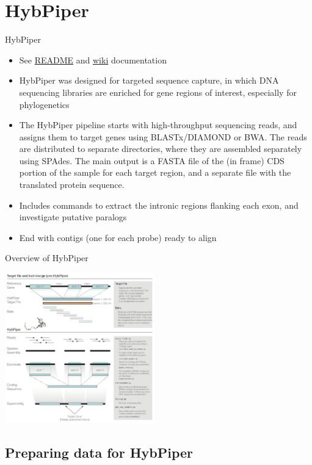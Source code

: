 \documentclass[compress,  xelatex, 11pt, xcolor=x11names, aspectratio=169,
	hyperref={
		bookmarks=true,
		unicode=true,
		colorlinks=true,
		pdftitle={HybSeq course},
		plainpages=false,
		pdfauthor={Vojtech Zeisek},
		pdfsubject={Practical processing of HybSeq target enrichment sequencing data on computing grids like MetaCentrum},
		pdfcreator={XeLaTeX},
		pdfkeywords={BASH, command line, GNU, HybSeq, Linux, MetaCentrum, sequencing shell, target enrichment},
		linkcolor=Turquoise4, %
		anchorcolor=DodgerBlue4, %
		citecolor=DodgerBlue4, %
		filecolor=DodgerBlue4, %
		menucolor=Tan4, %
		urlcolor=DarkOliveGreen4 %
		},
	url={hyphens, lowtilde} %
	]{beamer}
\begin{document}
\section{HybPiper}

\begin{frame}{HybPiper}
	\begin{itemize}
		\item See \href{https://github.com/mossmatters/HybPiper\#readme}{README} and \href{https://github.com/mossmatters/HybPiper/wiki}{wiki} documentation
		\item HybPiper was designed for targeted sequence capture, in which DNA sequencing libraries are enriched for gene regions of interest, especially for phylogenetics
		\item The HybPiper pipeline starts with high-throughput sequencing reads, and assigns them to target genes using BLASTx/DIAMOND or BWA. The reads are distributed to separate directories, where they are assembled separately using SPAdes. The main output is a FASTA file of the (in frame) CDS portion of the sample for each target region, and a separate file with the translated protein sequence.
		\item Includes commands to extract the intronic regions flanking each exon, and investigate putative paralogs
		\item End with contigs (one for each probe) ready to align
	\end{itemize}
\end{frame}

\begin{frame}{Overview of HybPiper}
	\begin{center}
		\includegraphics[height=6.5cm]{hybpiper.png}
	\end{center}
\end{frame}

\subsection{Preparing data for HybPiper}
\end{document}
